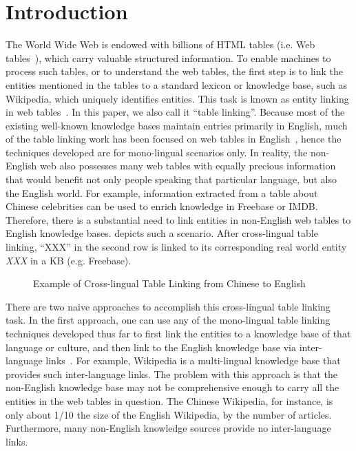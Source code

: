 \section{Introduction}

The World Wide Web is endowed with billions of HTML tables
(i.e. Web tables~\cite{cafarella2008webtables,wang2012understanding}), which carry
valuable structured information. To enable machines to process such tables, or to understand
the web tables, the first step is to link the entities mentioned in the 
tables to a standard lexicon or knowledge base, such as Wikipedia, which 
uniquely identifies entities. This task is
known as entity linking in web tables~\cite{bhagavatula2015tabel,wu2016entity}.
In this paper, we also call it ``table linking''. Because most of the existing
well-known knowledge bases maintain entries primarily in English, much of the table linking
work has been focused on web tables in English~\cite{bhagavatula2015tabel,limaye2010annotating},
hence the techniques developed are for mono-lingual scenarios only.
In reality, the non-English web also possesses many web tables with equally precious information
that would benefit not only people speaking that particular language,
but also the English world.
For example, information extracted from a table about Chinese celebrities can be
used to enrich knowledge in Freebase or IMDB.
Therefore, there is a substantial need to link entities in non-English web tables
to English knowledge bases.  depicts such a scenario. 
After cross-lingual table linking, ``XXX'' in the second row is linked to its 
corresponding real world entity \textit{XXX} in a KB (e.g. Freebase).

\begin{figure}[th]

\caption{Example of Cross-lingual Table Linking from Chinese to English}
\label{fig:chinesetable}
\end{figure}

There are two naive approaches to accomplish this cross-lingual table linking task.
In the first approach, one can use any of the mono-lingual table linking techniques developed thus far
to first link the entities to a knowledge base of that language or culture, and then link to
the English knowledge base via inter-language links~\cite{tsai2016cross}.
For example, Wikipedia is a multi-lingual knowledge base that provides such inter-language links. 
The problem with this approach is that the non-English knowledge base may not be
comprehensive enough to carry all the entities in the web tables in question.
The Chinese Wikipedia, for instance, is only about 1/10 the size of the English
Wikipedia, by the number of articles. Furthermore, many non-English knowledge sources
provide no inter-language links. 

